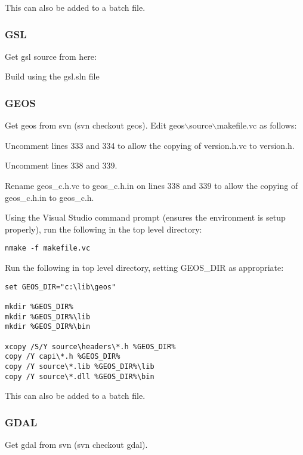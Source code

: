 This can also be added to a batch file.

\subsubsection{GSL}
Get gsl source from here:

	\begin{quotation}
	\end{quotation}
Build using the gsl.sln file

\subsubsection{GEOS}
Get geos from svn (svn checkout  geos).
Edit geos$\backslash$source$\backslash$makefile.vc as follows:

Uncomment lines 333 and 334 to allow the copying of version.h.vc to version.h.

Uncomment lines 338 and 339.

Rename geos\_c.h.vc to geos\_c.h.in on lines 338 and 339 to allow the copying of geos\_c.h.in to geos\_c.h.

Using the Visual Studio command prompt (ensures the environment is setup properly), run the following in the top level directory:

\begin{verbatim}
nmake -f makefile.vc 
\end{verbatim}

Run the following in top level directory, setting GEOS\_DIR as appropriate:

\begin{verbatim}
set GEOS_DIR="c:\lib\geos"

mkdir %GEOS_DIR%
mkdir %GEOS_DIR%\lib
mkdir %GEOS_DIR%\bin

xcopy /S/Y source\headers\*.h %GEOS_DIR%
copy /Y capi\*.h %GEOS_DIR%
copy /Y source\*.lib %GEOS_DIR%\lib
copy /Y source\*.dll %GEOS_DIR%\bin
\end{verbatim}

This can also be added to a batch file.

\subsubsection{GDAL}
Get gdal from svn (svn checkout  gdal).

